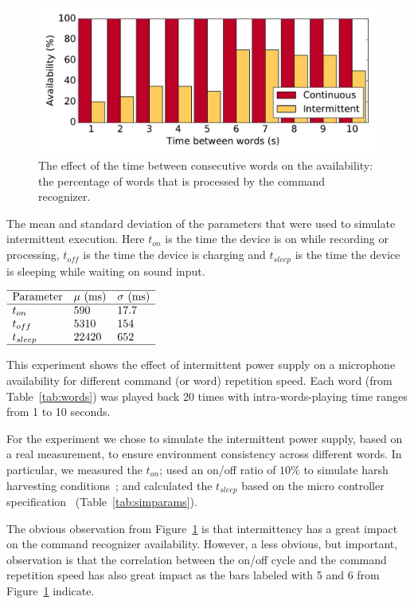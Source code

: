 \begin{figure}
\centering
\includegraphics[width=\linewidth]{figures/word_freq}
\caption{The effect of the time between consecutive words on the availability: the percentage of words that is processed by the command recognizer. }
\label{fig:word_freq}
\end{figure}
%
\begin{table}
	\centering
	\caption{The mean and standard deviation of the parameters that were used to simulate intermittent execution. Here $t_{on}$ is the time the device is on while recording or processing, $t_{off}$ is the time the device is charging and $t_{sleep}$ is the time the device is sleeping while waiting on sound input.}
	\label{tab:simparams}
$
\begin{array}{lll}\hline
\text{Parameter} & \mu \text{ (ms)} & \sigma \text{ (ms)} \\\hline
t_{on} &  590 & 17.7 \\
t_{off} & 5310 & 154 \\
t_{sleep} &  22420 & 652 \\\hline
\end{array}
$
\end{table}
%
This experiment shows the effect of intermittent power supply on a microphone availability  for different command (or word) repetition speed. Each word (from Table~\ref{tab:words}) was played back 20 times with intra-words-playing time ranges from 1 to 10 seconds. 

For the experiment we chose to simulate the intermittent power supply, based on a real measurement, to ensure environment consistency across different words.
In particular, we measured the $t_{on}$; used an on/off ratio of $10\%$ to simulate harsh harvesting conditions~\cite{mementos, harvOS,lucia}; and calculated the $t_{sleep}$ based on the micro controller specification~\cite{datasheet} (Table~\ref{tab:simparams}).     

The obvious observation from Figure~\ref{fig:word_freq} is that intermittency has a great impact on the command recognizer availability. However, a less obvious, but important, observation is that the correlation between the on/off cycle and the command repetition speed has also great impact as the bars labeled with 5 and 6 from Figure~\ref{fig:word_freq} indicate. 





